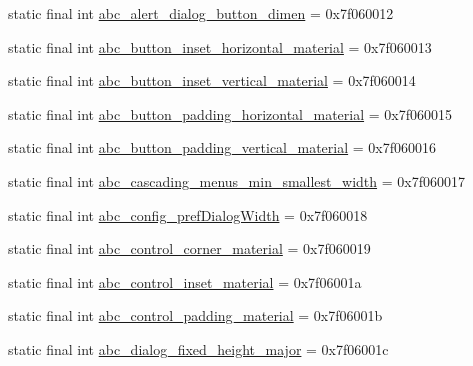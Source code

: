 \begin{DoxyCompactItemize}
static final int \mbox{\hyperlink{classandroid_1_1support_1_1v7_1_1appcompat_1_1_r_1_1dimen_aa73657432b4e4791b106e21a984b5c98}{abc\+\_\+alert\+\_\+dialog\+\_\+button\+\_\+dimen}} = 0x7f060012
\item 
static final int \mbox{\hyperlink{classandroid_1_1support_1_1v7_1_1appcompat_1_1_r_1_1dimen_ac53d3135eb3d115bf3286735276dd240}{abc\+\_\+button\+\_\+inset\+\_\+horizontal\+\_\+material}} = 0x7f060013
\item 
static final int \mbox{\hyperlink{classandroid_1_1support_1_1v7_1_1appcompat_1_1_r_1_1dimen_a6536a246e0a31fd4ba7f4181e955dabe}{abc\+\_\+button\+\_\+inset\+\_\+vertical\+\_\+material}} = 0x7f060014
\item 
static final int \mbox{\hyperlink{classandroid_1_1support_1_1v7_1_1appcompat_1_1_r_1_1dimen_aa2efa92063f2ff2083d5ed60dcd38692}{abc\+\_\+button\+\_\+padding\+\_\+horizontal\+\_\+material}} = 0x7f060015
\item 
static final int \mbox{\hyperlink{classandroid_1_1support_1_1v7_1_1appcompat_1_1_r_1_1dimen_aff8aac206e359494fadb9f6730581fe2}{abc\+\_\+button\+\_\+padding\+\_\+vertical\+\_\+material}} = 0x7f060016
\item 
static final int \mbox{\hyperlink{classandroid_1_1support_1_1v7_1_1appcompat_1_1_r_1_1dimen_a9dd9e68e0c12d3c75864e9be2de44a7a}{abc\+\_\+cascading\+\_\+menus\+\_\+min\+\_\+smallest\+\_\+width}} = 0x7f060017
\item 
static final int \mbox{\hyperlink{classandroid_1_1support_1_1v7_1_1appcompat_1_1_r_1_1dimen_a2977b61339311ee48206b57404b7d61d}{abc\+\_\+config\+\_\+pref\+Dialog\+Width}} = 0x7f060018
\item 
static final int \mbox{\hyperlink{classandroid_1_1support_1_1v7_1_1appcompat_1_1_r_1_1dimen_a13f81d258daed6e1dcadc20a7aa5bc23}{abc\+\_\+control\+\_\+corner\+\_\+material}} = 0x7f060019
\item 
static final int \mbox{\hyperlink{classandroid_1_1support_1_1v7_1_1appcompat_1_1_r_1_1dimen_a65e3e7e15aaf39699c9b1817f971c427}{abc\+\_\+control\+\_\+inset\+\_\+material}} = 0x7f06001a
\item 
static final int \mbox{\hyperlink{classandroid_1_1support_1_1v7_1_1appcompat_1_1_r_1_1dimen_ae9d833d10a6a830c2469c672675f9e19}{abc\+\_\+control\+\_\+padding\+\_\+material}} = 0x7f06001b
\item 
static final int \mbox{\hyperlink{classandroid_1_1support_1_1v7_1_1appcompat_1_1_r_1_1dimen_a80371870c7a9ca3b13f51eba5501c521}{abc\+\_\+dialog\+\_\+fixed\+\_\+height\+\_\+major}} = 0x7f06001c
\item 

\end{DoxyCompactItemize}
